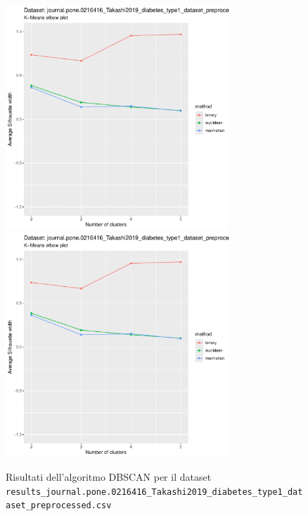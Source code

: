 \documentclass[12pt]{report}
\begin{document}
			\begin{figure}[h]
				\centering
				\includegraphics[width = 0.75\textwidth, height = 0.45\textheight, page = 5]{
					results/results_journal.pone.0216416_Takashi2019_diabetes_type1_dataset_preprocessed.csv.pdf
				}
				\includegraphics[width = 0.75\textwidth, height = 0.45\textheight, page = 6]{
					results/results_journal.pone.0216416_Takashi2019_diabetes_type1_dataset_preprocessed.csv.pdf
				}
				\caption{Risultati dell'algoritmo DBSCAN per il dataset
				\texttt{results\_journal.pone.0216416\_Takashi2019\_diabetes\_type1\_dataset\_preprocessed.csv}}
				\label{fig:dbscan4}
			\end{figure}
\end{document}
